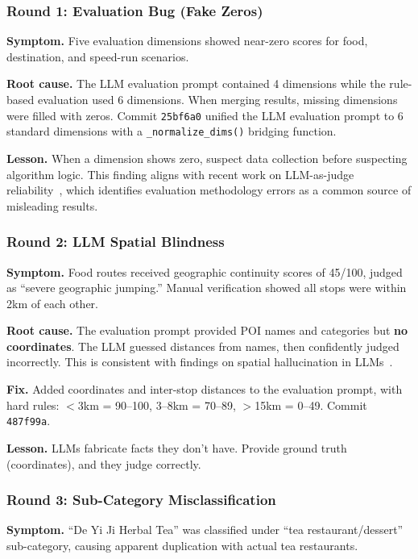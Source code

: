 \subsubsection{Round 1: Evaluation Bug (Fake Zeros)}

\textbf{Symptom.} Five evaluation dimensions showed near-zero scores for food, destination, and speed-run scenarios.

\textbf{Root cause.} The LLM evaluation prompt contained 4 dimensions while the rule-based evaluation used 6 dimensions. When merging results, missing dimensions were filled with zeros. Commit \texttt{25bf6a0} unified the LLM evaluation prompt to 6 standard dimensions with a \texttt{\_normalize\_dims()} bridging function.

\textbf{Lesson.} When a dimension shows zero, suspect data collection before suspecting algorithm logic. This finding aligns with recent work on LLM-as-judge reliability~\cite{gu2024llmjudge}, which identifies evaluation methodology errors as a common source of misleading results.

\subsubsection{Round 2: LLM Spatial Blindness}

\textbf{Symptom.} Food routes received geographic continuity scores of 45/100, judged as ``severe geographic jumping.'' Manual verification showed all stops were within 2km of each other.

\textbf{Root cause.} The evaluation prompt provided POI names and categories but \textbf{no coordinates}. The LLM guessed distances from names, then confidently judged incorrectly. This is consistent with findings on spatial hallucination in LLMs~\cite{zhang2025spatial}.

\textbf{Fix.} Added coordinates and inter-stop distances to the evaluation prompt, with hard rules: $<$3km = 90--100, 3--8km = 70--89, $>$15km = 0--49. Commit \texttt{487f99a}.

\textbf{Lesson.} LLMs fabricate facts they don't have. Provide ground truth (coordinates), and they judge correctly.

\subsubsection{Round 3: Sub-Category Misclassification}

\textbf{Symptom.} ``De Yi Ji Herbal Tea'' was classified under ``tea restaurant/dessert'' sub-category, causing apparent duplication with actual tea restaurants.

